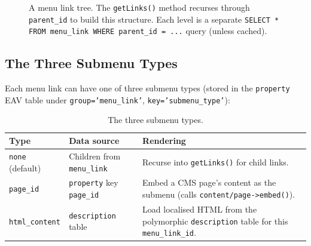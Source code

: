 \documentclass[11pt,a4paper]{article}
\begin{document}
\begin{figure}[htbp]
\centering
{}
\caption{A menu link tree. The \texttt{getLinks()} method recurses
through \texttt{parent\_id} to build this structure. Each level is
a separate \texttt{SELECT * FROM menu\_link WHERE parent\_id = ...}
query (unless cached).}
\label{fig:menu-tree}
\end{figure}

\subsection{The Three Submenu Types}

Each menu link can have one of three submenu types (stored in the
\texttt{property} EAV table under \texttt{group='menu\_link'},
\texttt{key='submenu\_type'}):

\begin{table}[htbp]
\centering
\caption{The three submenu types.}\label{tab:submenu-types}
\small
\begin{tabularx}{\columnwidth}{llX}
\toprule
\textbf{Type} & \textbf{Data source} & \textbf{Rendering} \\
\midrule
\texttt{none} (default) & Children from \texttt{menu\_link} & Recurse into \texttt{getLinks()} for child links. \\
\texttt{page\_id}       & \texttt{property} key \texttt{page\_id} & Embed a CMS page's content as the submenu (calls \texttt{content/page->embed()}). \\
\texttt{html\_content}  & \texttt{description} table & Load localised HTML from the polymorphic \texttt{description} table for this \texttt{menu\_link\_id}. \\
\bottomrule
\end{tabularx}
\end{table}
\end{document}
